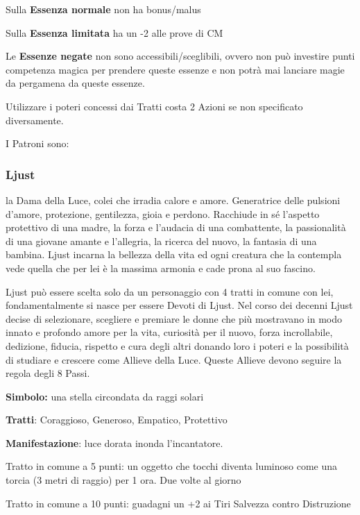 \documentclass[a4paper,11pt,twoside,openany]{book}
\begin{document}
{Sulla \textbf{Essenza normale} non ha bonus/malus

Sulla \textbf{Essenza limitata} ha un -2 alle prove di CM

Le \textbf{Essenze negate} non sono accessibili/sceglibili, ovvero non può investire punti competenza magica per prendere queste essenze e non potrà mai lanciare magie da pergamena da queste essenze.

Utilizzare i poteri concessi dai Tratti costa 2 Azioni se non specificato diversamente.

I Patroni sono:

\subsubsection{Ljust}

\label{ljust}

la Dama della Luce, colei che irradia calore e amore. Generatrice delle pulsioni d'amore, protezione, gentilezza, gioia e perdono. Racchiude in sé l'aspetto protettivo di una madre, la forza e l'audacia di una combattente, la passionalità di una giovane amante e l'allegria, la ricerca del nuovo, la fantasia di una bambina. Ljust incarna la bellezza della vita ed ogni creatura che la contempla vede quella che per lei è la massima armonia e cade prona al suo fascino.

Ljust può essere scelta solo da un personaggio con 4 tratti in comune con lei, fondamentalmente si nasce per essere Devoti di Ljust. Nel corso dei decenni Ljust decise di selezionare, scegliere e premiare le donne che più mostravano in modo innato e profondo amore per la vita, curiosità per il nuovo, forza incrollabile, dedizione, fiducia, rispetto e cura degli altri donando loro i poteri e la possibilità di studiare e crescere come Allieve della Luce. Queste Allieve devono seguire la regola degli 8 Passi.

\textbf{Simbolo:} una stella circondata da raggi solari

\textbf{Tratti}: Coraggioso, Generoso, Empatico, Protettivo

\textbf{Manifestazione}: luce dorata inonda l'incantatore.

\bigskip

Tratto in comune a 5 punti: un oggetto che tocchi diventa luminoso come una torcia (3 metri di raggio) per 1 ora. Due volte al giorno

Tratto in comune a 10 punti: guadagni un +2 ai Tiri Salvezza contro Distruzione

}
\end{document}

